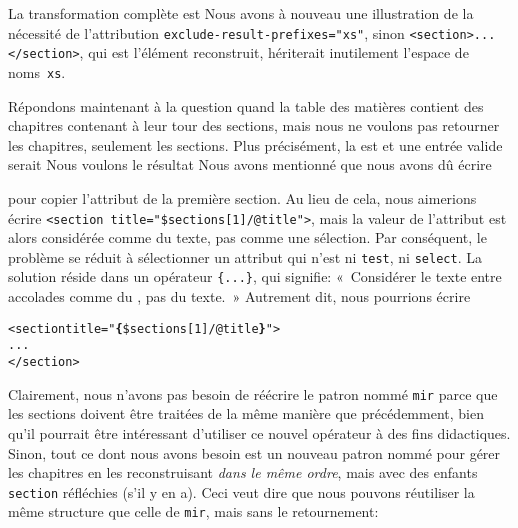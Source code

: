 La transformation complète est
\noindent Nous avons à nouveau une illustration de la nécessité de
l'attribution \texttt{exclude-result-prefixes="xs"}, sinon
\texttt{<section>...</section>}, qui est l'élément reconstruit,
hériterait inutilement l'espace de noms~\texttt{xs}.

Répondons maintenant à la question quand la table des matières
contient des chapitres contenant à leur tour des sections, mais
nous ne voulons pas retourner les chapitres, seulement les
sections. Plus précisément, la \DTD est
\noindent et une entrée valide serait
\noindent Nous voulons le résultat
\noindent Nous avons mentionné que nous avons dû écrire
pour copier l'attribut de la première section. Au lieu de cela, nous
aimerions écrire \texttt{<section title="\$sections[1]/@title">}, mais
la valeur de l'attribut est alors considérée comme du texte, pas comme
une sélection. Par conséquent, le problème se réduit à sélectionner un
attribut qui n'est ni \texttt{test}, ni \texttt{select}. La solution
réside dans un opérateur \XPath \texttt{\{...\}}, qui signifie:
«~Considérer le texte entre accolades comme du \XPath, pas du texte.~»
Autrement dit, nous pourrions écrire
\begin{alltt}
\small      <section title="\textbf{\{}\$sections[1]/@title\textbf{\}}">
        ...
      </section>
\end{alltt}
Clairement, nous n'avons pas besoin de réécrire le patron nommé
\texttt{mir} parce que les sections doivent être traitées de la même
manière que précédemment, bien qu'il pourrait être intéressant
d'utiliser ce nouvel opérateur \XPath à des fins didactiques. Sinon,
tout ce dont nous avons besoin est un nouveau patron nommé pour gérer
les chapitres en les reconstruisant \emph{dans le même ordre}, mais
avec des enfants \texttt{section} réfléchies (s'il y en a). Ceci veut
dire que nous pouvons réutiliser la même structure que celle de
\texttt{mir}, mais sans le retournement:
